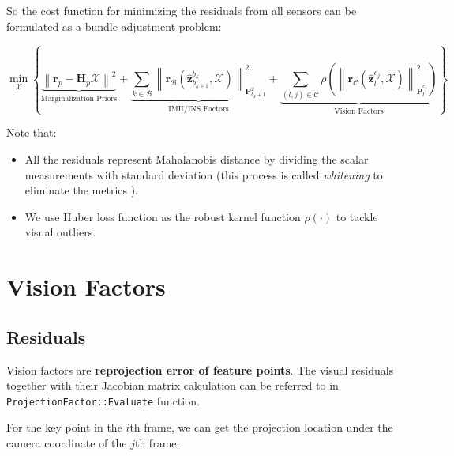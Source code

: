 \documentclass[12pt]{report}   %
\begin{document}
So the cost function for minimizing the residuals from all sensors can be formulated as a bundle adjustment problem:

\begin{equation}
	\min_{\mathcal{X}}  \left\{
		\underbrace{
			\left\|\mathbf{r}_{p}-\mathbf{H}_{p} \mathcal{X}\right\|^{2}
		}_{\text{Marginalization Priors}}
		+
		\underbrace{
			\sum_{k \in \mathcal{B}}\left\|\mathbf{r}_{\mathcal{B}}\left(\hat{\mathbf{z}}_{b_{k+1}}^{b_{k}}, \mathcal{X}\right)\right\|_{\mathbf{P}_{b_{k}+1}^{2}}^{2}
		}_{\text{IMU/INS Factors}}
		+
		\underbrace{
			\sum_{(l, j) \in \mathcal{C}} \rho\left(\left\|\mathbf{r}_{\mathcal{C}}\left(\hat{\mathbf{z}}_{l}^{c_{j}}, \mathcal{X}\right)\right\|_{\mathbf{P}_{l}^{c_{j}}}^{2}\right)
		}_{\text{Vision Factors}}
		\right\} \label{joint_optimization}
\end{equation}

Note that:
\begin{itemize}
	\item All the residuals represent Mahalanobis distance by dividing the scalar measurements with standard deviation (this process is called \textit{whitening} to eliminate the metrics \cite{dellaert2017factor}).
	\item We use Huber loss function as the robust kernel function $\rho(\cdot)$ to tackle visual outliers.
\end{itemize}


\section{Vision Factors}


\subsection{Residuals}

	Vision factors are \textbf{reprojection error of feature points}. The visual residuals together with their Jacobian matrix calculation can be referred to in \verb|ProjectionFactor::Evaluate| function. 
	
	For the key point in the $i$th frame, we can get the projection location under the camera coordinate of the $j$th frame.
	
\end{document}
